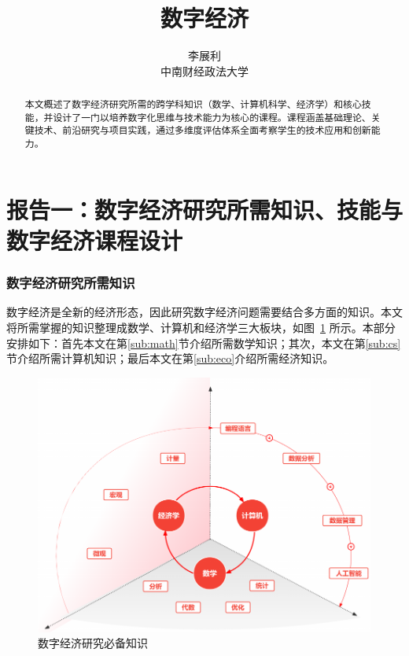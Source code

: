 \documentclass[lang=cn,12pt,a4paper]{elegantpaper}
\title{数字经济}
\author{李展利 \\  中南财经政法大学}
\institute{\href{https://elegantlatex.org/}{Elegant\LaTeX{} 项目组}}
\date{}
\begin{document}

\newpage

\tableofcontents
\newpage  %
\part{报告一：数字经济研究所需知识、技能与数字经济课程设计}
\begin{abstract}
本文概述了数字经济研究所需的跨学科知识（数学、计算机科学、经济学）和核心技能，并设计了一门以培养数字化思维与技术能力为核心的课程。课程涵盖基础理论、关键技术、前沿研究与项目实践，通过多维度评估体系全面考察学生的技术应用和创新能力。
\end{abstract}
\section{数字经济研究所需知识}
数字经济是全新的经济形态，因此研究数字经济问题需要结合多方面的知识。本文将所需掌握的知识整理成数学、计算机和经济学三大板块，如图~\ref{fig:eco_founda} 所示。本部分安排如下：首先本文在第\ref{sub:math}节介绍所需数学知识；其次，本文在第\ref{sub:cs}节介绍所需计算机知识；最后本文在第\ref{sub:eco}介绍所需经济知识。
\begin{figure}[H]
    \centering
    \includegraphics[width=0.86\linewidth]{intro.png}
    \caption{数字经济研究必备知识}
    \label{fig:eco_founda}
\end{figure}
\end{document}
